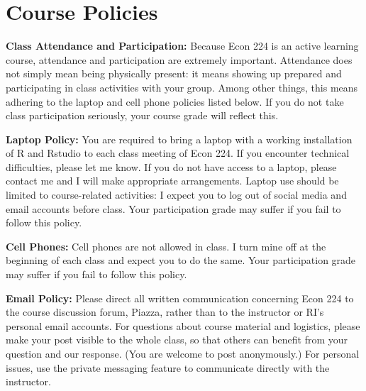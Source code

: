 \documentclass[11pt, letterpaper]{article}
\begin{document}
\section*{Course Policies}


\noindent \textbf{Class Attendance and Participation:}
Because Econ 224 is an active learning course, attendance and participation are extremely important. 
Attendance does not simply mean being physically present: it means showing up prepared and participating in class activities with your group.
Among other things, this means adhering to the laptop and cell phone policies listed below.
If you do not take class participation seriously, your course grade will reflect this.


\medskip

\noindent \textbf{Laptop Policy:} You are required to bring a laptop with a working installation of R and Rstudio to each class meeting of Econ 224.
If you encounter technical difficulties, please let me know.
If you do not have access to a laptop, please contact me and I will make appropriate arrangements.
Laptop use should be limited to course-related activities: I expect you to log out of social media and email accounts before class.
Your participation grade may suffer if you fail to follow this policy.

\medskip

\noindent \textbf{Cell Phones:} Cell phones are not allowed in class. 
I turn mine off at the beginning of each class and expect you to do the same.
Your participation grade may suffer if you fail to follow this policy.

\medskip

\noindent \textbf{Email Policy:}
Please direct all written communication concerning Econ 224 to the course discussion forum, Piazza, rather than to the instructor or RI's personal email accounts.
For questions about course material and logistics, please make your post visible to the whole class, so that others can benefit from your question and our response.
(You are welcome to post anonymously.)
For personal issues, use the private messaging feature to communicate directly with the instructor. 
\end{document}
